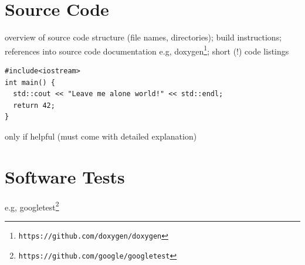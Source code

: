 \documentclass{book}
\begin{document}
\section{Source Code}

overview of source code structure (file names, directories); build instructions; references into source code documentation e.g, doxygen\footnote{\tt https://github.com/doxygen/doxygen}; short (!) code listings 
\begin{lstlisting}
#include<iostream>
int main() {
  std::cout << "Leave me alone world!" << std::endl;
  return 42;
}
\end{lstlisting}
only if helpful (must come with detailed explanation)

\section{Software Tests}

e.g, googletest\footnote{\tt https://github.com/google/googletest}
\end{document}
